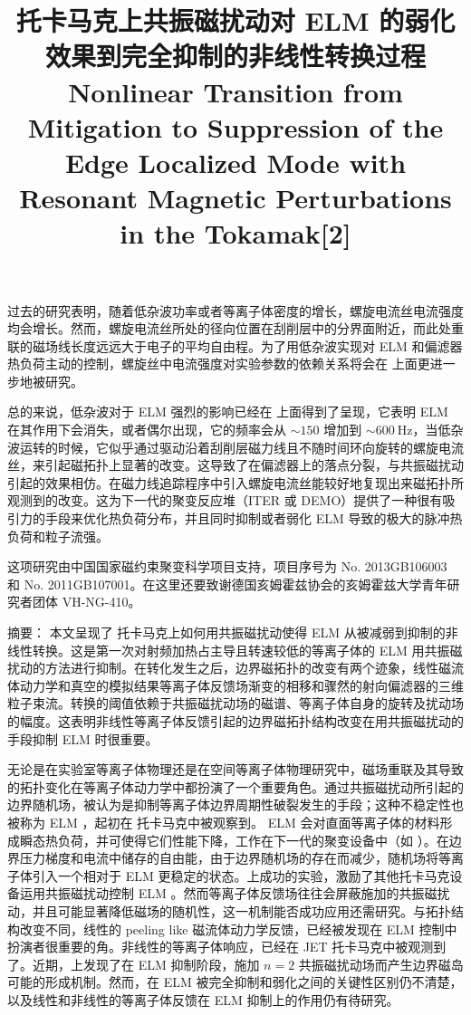 \east 过去的研究表明，随着低杂波功率或者等离子体密度的增长，螺旋电流丝电流强度均会增长。然而，螺旋电流丝所处的径向位置在刮削层中的分界面附近，而此处重联的磁场线长度远远大于电子的平均自由程。为了用低杂波实现对 ELM 和偏滤器热负荷主动的控制，螺旋丝中电流强度对实验参数的依赖关系将会在 \east 上面更进一步地被研究。

总的来说，低杂波对于 ELM 强烈的影响已经在 \east 上面得到了呈现，它表明 ELM 在其作用下会消失，或者偶尔出现，它的频率会从 $\sim 150$ 增加到 $\sim\SI{600}{\hertz}$，当低杂波运转的时候，它似乎通过驱动沿着刮削层磁力线且不随时间环向旋转的螺旋电流丝，来引起磁拓扑上显著的改变。这导致了在偏滤器上的落点分裂，与共振磁扰动引起的效果相仿。在磁力线追踪程序中引入螺旋电流丝能较好地复现出来磁拓扑所观测到的改变。这为下一代的聚变反应堆（ITER 或 DEMO）提供了一种很有吸引力的手段来优化热负荷分布，并且同时抑制或者弱化 ELM 导致的极大的脉冲热负荷和粒子流强。

这项研究由中国国家磁约束聚变科学项目支持，项目序号为 No. 2013GB106003 和 No. 2011GB107001。在这里还要致谢德国亥姆霍兹协会的亥姆霍兹大学青年研究者团体  VH-NG-410。



\title{{\heiti \east 托卡马克上共振磁扰动对 ELM 的弱化效果到完全抑制的非线性转换过程}\\Nonlinear Transition from Mitigation to Suppression of the Edge Localized Mode with Resonant Magnetic Perturbations in the \east Tokamak[2]}

{\heiti 摘要：} {\kaishu 本文呈现了 \east 托卡马克上如何用共振磁扰动使得 ELM 从被减弱到抑制的非线性转换。这是第一次对射频加热占主导且转速较低的等离子体的 ELM 用共振磁扰动的方法进行抑制。在转化发生之后，边界磁拓扑的改变有两个迹象，线性磁流体动力学和真空的模拟结果等离子体反馈场渐变的相移和骤然的射向偏滤器的三维粒子束流。转换的阈值依赖于共振磁扰动场的磁谱、等离子体自身的旋转及扰动场的幅度。这表明非线性等离子体反馈引起的边界磁拓扑结构改变在用共振磁扰动的手段抑制 ELM 时很重要。}


无论是在实验室等离子体物理还是在空间等离子体物理研究中，磁场重联及其导致的拓扑变化在等离子体动力学中都扮演了一个重要角色。通过共振磁扰动所引起的边界随机场，被认为是抑制等离子体边界周期性破裂发生的手段；这种不稳定性也被称为 ELM ，起初在 \ddd 托卡马克中被观察到。 ELM 会对直面等离子体的材料形成瞬态热负荷，并可使得它们性能下降，工作在下一代的聚变设备中（如 \iter）。在边界压力梯度和电流中储存的自由能，由于边界随机场的存在而减少，随机场将等离子体引入一个相对于 ELM 更稳定的状态。\ddd 上成功的实验，激励了其他托卡马克设备运用共振磁扰动控制 ELM 。然而等离子体反馈场往往会屏蔽施加的共振磁扰动，并且可能显著降低磁场的随机性，这一机制能否成功应用还需研究。与拓扑结构改变不同，线性的 peeling like 磁流体动力学反馈，已经被发现在 ELM 控制中扮演者很重要的角。非线性的等离子体响应，已经在 JET 托卡马克中被观测到了。近期，\ddd 上发现了在 ELM 抑制阶段，施加 $n=2$ 共振磁扰动场而产生边界磁岛可能的形成机制。然而，在 ELM 被完全抑制和弱化之间的关键性区别仍不清楚，以及线性和非线性的等离子体反馈在 ELM 抑制上的作用仍有待研究。

